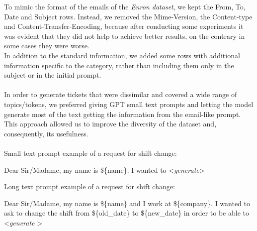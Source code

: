 To mimic the format of the emails of the \textit{Enron dataset}, we kept the From, To, Date and Subject rows. Instead, we removed the Mime-Version, the Content-type and Content-Transfer-Encoding, because after conducting some experiments it was evident that they did not help to achieve better results, on the contrary in some cases they were worse. \\
In addition to the standard information, we added some rows with additional information specific to the category, rather than including them only in the subject or in the initial prompt. \\
\\
In order to generate tickets that were dissimilar and covered a wide range of topics/tokens, we preferred giving GPT small text prompts and letting the model generate most of the text getting the information from the email-like prompt. This approach allowed us to improve the diversity of the dataset and, consequently, its usefulness. \\
\\
Small text prompt example of a request for shift change:
\begin{adjustwidth}{1cm}{}
    Dear Sir/Madame, my name is \$\{name\}. I wanted to \textless \textit{generate}\textgreater
\end{adjustwidth}

Long text prompt example of a request for shift change:
\begin{adjustwidth}{1cm}{}
    Dear Sir/Madame, my name is \$\{name\} and I work at \$\{company\}. I wanted to ask to change the shift from \$\{old\_date\} to \$\{new\_date\} in order to be able to \textless \textit{generate} \textgreater
\end{adjustwidth}